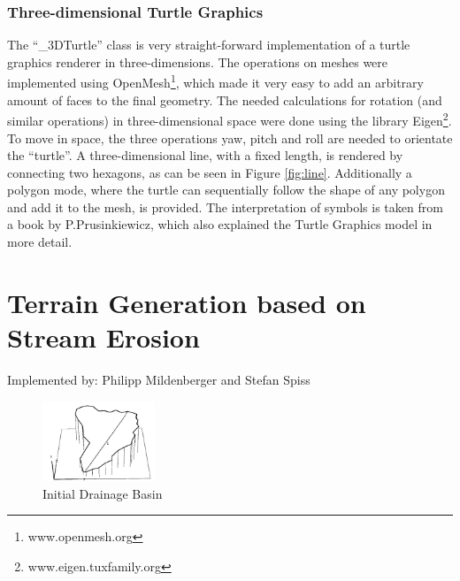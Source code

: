 \documentclass[11pt,a4paper]{article}
\begin{document}
\subsubsection{Three-dimensional Turtle Graphics}
The ``\_3DTurtle'' class is very straight-forward implementation of a turtle
graphics renderer in three-dimensions. The operations on meshes were implemented
using OpenMesh\footnote{www.openmesh.org}, which made it very easy to add an
arbitrary amount of faces to the final geometry. The needed calculations for
rotation (and similar operations) in three-dimensional space were done using the
library Eigen\footnote{www.eigen.tuxfamily.org}. To move in space, the three
operations yaw, pitch and roll are needed to orientate the ``turtle''. A
three-dimensional line, with a fixed length, is rendered by connecting two
hexagons, as can be seen in Figure \ref{fig:line}. Additionally a polygon mode,
where the turtle can sequentially follow the shape of any polygon and add it to
the mesh, is provided. The interpretation of symbols is taken from a book by
P.Prusinkiewicz\cite{prusinkiewicz1990algorithmic}, which also explained the Turtle Graphics model in more detail.

\section{Terrain Generation based on Stream Erosion}
Implemented by: Philipp Mildenberger and Stefan Spiss

\begin{figure}
  \vspace{-20pt}
  \begin{center}
    \includegraphics[width=0.3\textwidth]{images/DrainageInitial}
  \end{center}
  \vspace{-20pt}
  \caption{Initial Drainage Basin \cite{kelley1988terrain}}
  \label{fig:initDrain}
  \vspace{-10pt}
\end{figure}
\end{document}
